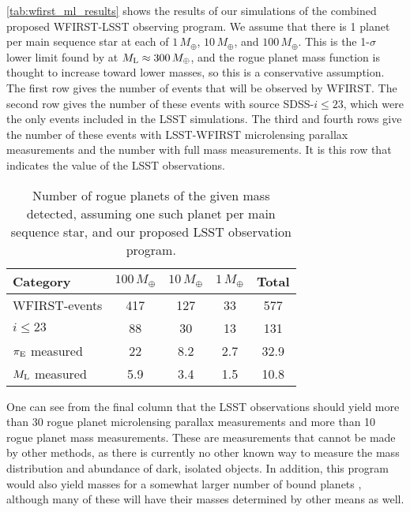 \autoref{tab:wfirst_ml_results}
shows the results of our simulations of the combined proposed WFIRST-LSST
observing program. We assume that there is 1 planet per main sequence
star at each of $1\,M_\oplus$, $10\,M_\oplus$, and $100\,M_\oplus$.
This is the 1-$\sigma$ lower limit found by \citet{2011Natur.473..349S} at
$M_{\rm L} \approx 300\,M_\oplus$, and the rogue planet mass function is
thought to increase toward lower masses, so this is a conservative
assumption. The first row gives the number of events that will be
observed by WFIRST. The second row gives the number of these events
with source SDSS-$i \leq 23$, which were the only events included in the
LSST simulations. The third and fourth rows give the number of these events
with LSST-WFIRST microlensing parallax measurements and the number
with full mass measurements. It is this row that indicates the
value of the LSST observations.

\begin{table}
\begin{tabular}{lcccc}
Category & $100\,M_\oplus$ & $10\,M_\oplus$ & $1\,M_\oplus$ & Total \\
\hline
WFIRST-events    &   417   &         127    &         33    &  577  \\
$i \leq 23$      &    88   &          30    &         13    &  131  \\
$\pi_{\rm E}$ measured &    22   &           8.2  &          2.7  &   32.9 \\
$M_{\rm L}$ measured   &    5.9  &           3.4  &          1.5  &   10.8 \\
\end{tabular}
\caption{Number of rogue planets of the given mass detected, assuming
one such planet per main sequence star, and our proposed LSST observation
program.}
\label{tab:wfirst_ml_results}
\end{table}

One can see from the final column that the LSST observations should
yield more than 30 rogue planet microlensing parallax measurements and
more than 10 rogue planet mass measurements.
%
These are measurements that cannot be made by other methods, as there is
currently no other known way to measure the mass distribution and abundance
of dark, isolated objects.
%
In addition, this program would
also yield masses for a somewhat larger number of bound planets
\citep{2003ApJ...591L..53G}, although many of these will have their
masses determined by other means as well.

